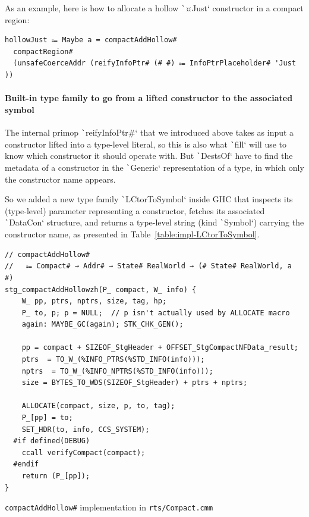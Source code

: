 \documentclass[english]{jflart}
\newlength{\currentparskip}
\newenvironment{unbreakable}
{%
  \setlength{\currentparskip}{\parskip}%
  \setlength{\parskip}{\currentparskip}%
  \par\vspace{0.5\baselineskip}%
  \noindent\begin{minipage}{\textwidth}%
    \setlength{\parskip}{\currentparskip}%
}
{%
  \end{minipage}%
  \par\vspace{0.5\baselineskip}%
}
\begin{document}
As an example, here is how to allocate a hollow \texttt`¤Just` constructor in a compact region:

\begin{unbreakable}
{\small
\begin{verbatim}
hollowJust ⩴ Maybe a = compactAddHollow#
  compactRegion#
  (unsafeCoerceAddr (reifyInfoPtr# (# #) ⩴ InfoPtrPlaceholder# 'Just ))
\end{verbatim}
\vspace{-0.8\baselineskip}
}
\end{unbreakable}

\paragraph{Built-in type family to go from a lifted constructor to the associated symbol}

The internal primop \texttt`reifyInfoPtr#` that we introduced above takes as input a constructor lifted into a type-level literal, so this is also what \texttt`fill` will use to know which constructor it should operate with. But \texttt`DestsOf` have to find the metadata of a constructor in the \texttt`Generic` representation of a type, in which only the constructor name appears.

So we added a new type family \texttt`LCtorToSymbol` inside GHC that inspects its (type-level) parameter representing a constructor, fetches its associated \texttt`DataCon` structure, and returns a type-level string (kind \texttt`Symbol`) carrying the constructor name, as presented in Table~\ref{table:impl-LCtorToSymbol}.

\begin{table}[p]
\small
\begin{verbatim}
// compactAddHollow#
//   ⩴ Compact# → Addr# → State# RealWorld → (# State# RealWorld, a #)
stg_compactAddHollowzh(P_ compact, W_ info) {
    W_ pp, ptrs, nptrs, size, tag, hp;
    P_ to, p; p = NULL;  // p isn't actually used by ALLOCATE macro
    again: MAYBE_GC(again); STK_CHK_GEN();

    pp = compact + SIZEOF_StgHeader + OFFSET_StgCompactNFData_result;
    ptrs  = TO_W_(%INFO_PTRS(%STD_INFO(info)));
    nptrs  = TO_W_(%INFO_NPTRS(%STD_INFO(info)));
    size = BYTES_TO_WDS(SIZEOF_StgHeader) + ptrs + nptrs;
    
    ALLOCATE(compact, size, p, to, tag);
    P_[pp] = to;
    SET_HDR(to, info, CCS_SYSTEM);
  #if defined(DEBUG)
    ccall verifyCompact(compact);
  #endif
    return (P_[pp]);
}
\end{verbatim}
\caption{\texttt{compactAddHollow\#} implementation in \texttt{rts/Compact.cmm}}
\label{table:impl-compactAddHollow}
\end{table}
\end{document}
